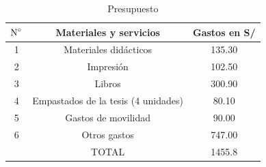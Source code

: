 \documentclass[12pt,a4paper]{article}
\begin{document}
\begin{table}[ht!]
	\caption{Presupuesto}\label{presup}
	\begin{tabular}{|c|c|c|}\hline
		$\text N^\circ$ & Materiales y servicios              & {Gastos en S/} \\\hline
		1               & Materiales didácticos               & 135.30                       \\\hline
		2               & Impresión                           & 102.50                       \\\hline
		3               & Libros                              & 300.90                       \\\hline
		4               & Empastados de la tesis (4 unidades) & 80.10                        \\\hline
		5               & Gastos de movilidad                 & 90.00                        \\\hline
		6               & Otros gastos                        & 747.00                       \\\hline
		                & TOTAL                               & 1455.8                       \\
		\hline
	\end{tabular}
\end{table}
\end{document}
